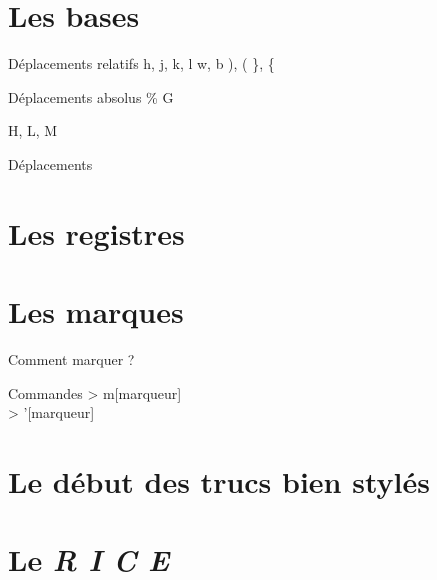 \documentclass[10pt]{beamer}
\begin{document}
		\section{Les bases}
			\begin{frame}{Déplacements relatifs}
				h, j, k, l
				w, b
				), (
				\}, \{

			\end{frame}

			\begin{frame}{Déplacements absolus}
				\%
				G

				H, L, M
			\end{frame}

			\begin{frame}{Déplacements}
			\end{frame}

		\section{Les registres}
			\begin{frame}{}
			\end{frame}

		\section{Les marques}
			\begin{frame}{Comment marquer ?}
				\begin{block}{Commandes}
					> m[marqueur]\\
					> '[marqueur]
				\end{block}
			\end{frame}

		\section{Le début des trucs bien stylés}
		\section{Le \textit{R I C E}}
\end{document}
